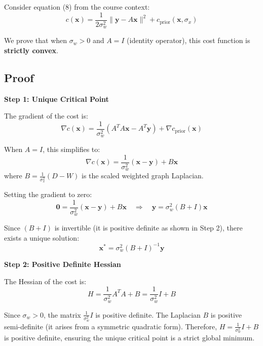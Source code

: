 \documentclass[12pt]{article}
\begin{document}
Consider equation (8) from the course context:
\begin{equation*}
c(\mathbf{x}) = \frac{1}{2\sigma_w^2} \|\mathbf{y} - A\mathbf{x}\|^2 + c_{\text{prior}}(\mathbf{x}, \sigma_x)
\end{equation*}

We prove that when $\sigma_w > 0$ and $A = I$ (identity operator), this cost function is \textbf{strictly convex}.

\subsection*{Proof}

\textbf{Step 1: Unique Critical Point}

The gradient of the cost is:
\begin{equation*}
\nabla c(\mathbf{x}) = \frac{1}{\sigma_w^2}(A^T A \mathbf{x} - A^T \mathbf{y}) + \nabla c_{\text{prior}}(\mathbf{x})
\end{equation*}

When $A = I$, this simplifies to:
\begin{equation*}
\nabla c(\mathbf{x}) = \frac{1}{\sigma_w^2}(\mathbf{x} - \mathbf{y}) + B\mathbf{x}
\end{equation*}
where $B = \frac{1}{\sigma_x^2}(D-W)$ is the scaled weighted graph Laplacian.

Setting the gradient to zero:
\begin{equation*}
\mathbf{0} = \frac{1}{\sigma_w^2}(\mathbf{x} - \mathbf{y}) + B\mathbf{x} \quad \Rightarrow \quad \mathbf{y} = \sigma_w^2 (B + I) \mathbf{x}
\end{equation*}

Since $(B + I)$ is invertible (it is positive definite as shown in Step 2), there exists a unique solution:
\begin{equation*}
\mathbf{x}^* = \sigma_w^2 (B + I)^{-1} \mathbf{y}
\end{equation*}

\textbf{Step 2: Positive Definite Hessian}

The Hessian of the cost is:
\begin{equation*}
H = \frac{1}{\sigma_w^2} A^T A + B = \frac{1}{\sigma_w^2} I + B
\end{equation*}

Since $\sigma_w > 0$, the matrix $\frac{1}{\sigma_w^2} I$ is positive definite. The Laplacian $B$ is positive semi-definite (it arises from a symmetric quadratic form). Therefore, $H = \frac{1}{\sigma_w^2} I + B$ is positive definite, ensuring the unique critical point is a strict global minimum.
\end{document}
